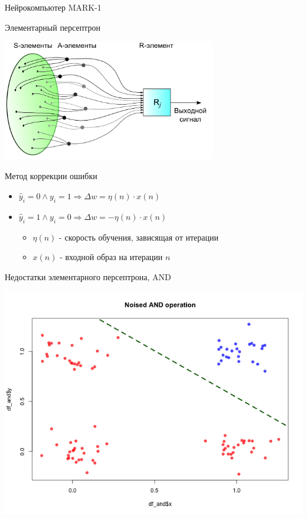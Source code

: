 \documentclass[10pt]{beamer}
\begin{document}
\begin{frame}{Нейрокомпьютер MARK-1}
\begin{figure}
\begin{subfigure}[b]{0.5\textwidth}
        \end{subfigure}
\end{figure}

\end{frame}


\begin{frame}{Элементарный персептрон}

\centering
\includegraphics[width=0.7\textwidth]{images/perceptron.png}
\begin{flushleft}
Метод коррекции ошибки
\begin{itemize}
	\item $\hat y_i = 0 \wedge y_i = 1 \Rightarrow \Delta w = \eta(n)\cdot x(n)$
	\item $\hat y_i = 1 \wedge y_i = 0 \Rightarrow \Delta w = -\eta(n)\cdot x(n)$
	\begin{itemize}
		\item $\eta(n)$ - скорость обучения, зависящая от итерации
		\item $x(n)$ - входной образ на итерации $n$
	\end{itemize}
\end{itemize}
\end{flushleft}

\end{frame}


\begin{frame}{Недостатки элементарного персептрона, AND}

\centering
\includegraphics[width=1\textwidth]{images/leakage_perceptron_and.png}

\end{frame}
\end{document}
